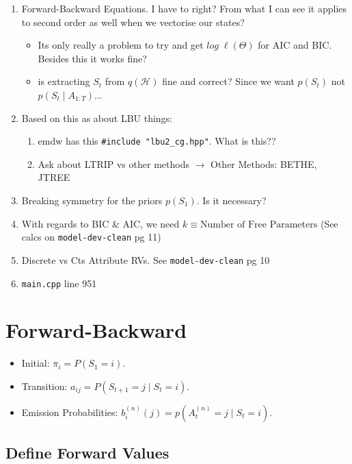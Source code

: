 \begin{enumerate}
    \item Forward-Backward Equations. I have to right? From what I can see it applies to second order as well when we vectorise our states? 
        \begin{itemize}
            \item Its only really a problem to try and get $log \; \ell(\Theta)$ for AIC and BIC. Besides this it works fine? 
            \item is extracting $S_t$ from $q(\mathcal{H})$ fine and correct? Since we want $p(S_t)$ not \\ 
                $p(S_t \mid A_{1:T})$...
        \end{itemize}
    \item Based on this as about LBU things:
        \begin{enumerate}
            \item emdw has this \verb|#include "lbu2_cg.hpp"|. What is this??
            \item Ask about LTRIP vs other methods $\rightarrow$ Other Methods: BETHE, JTREE
        \end{enumerate}
    \item Breaking symmetry for the priors $p(S_1)$. Is it necessary?
    \item With regards to BIC \& AIC, we need $k \equiv \text{Number of Free Parameters}$ (See calcs on \verb|model-dev-clean| pg 11)
    \item Discrete vs Cts Attribute RVs. See \verb|model-dev-clean| pg 10
    \item \verb|main.cpp| line 951

\end{enumerate}


\section{Forward-Backward}



\begin{itemize}
    \item Initial: $\pi_i = P(S_1=i)$.
    \item Transition: $a_{ij} = P(S_{t+1}=j \mid S_t=i)$.
    \item Emission Probabilities: $b_i^{(n)}(j) = p(A_t^{(n)}=j \mid S_t=i)$.
\end{itemize}


\subsection{Define Forward Values}

